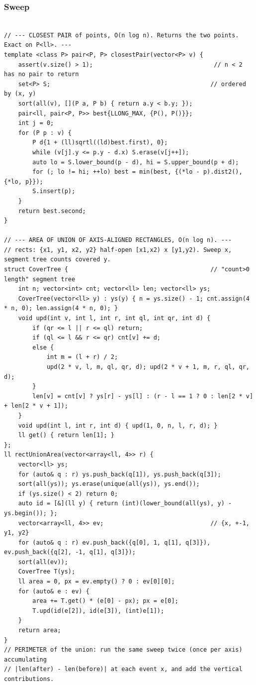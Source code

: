 \documentclass[9pt,a4paper,twocolumn]{extarticle}
\begin{document}
\filbreak
\subsubsection{Sweep}
\nopagebreak
\begin{lstlisting}

// --- CLOSEST PAIR of points, O(n log n). Returns the two points. Exact on P<ll>. ---
template <class P> pair<P, P> closestPair(vector<P> v) {
    assert(v.size() > 1);                                  // n < 2 has no pair to return
    set<P> S;                                             // ordered by (x, y)
    sort(all(v), [](P a, P b) { return a.y < b.y; });
    pair<ll, pair<P, P>> best{LLONG_MAX, {P(), P()}};
    int j = 0;
    for (P p : v) {
        P d{1 + (ll)sqrtl((ld)best.first), 0};
        while (v[j].y <= p.y - d.x) S.erase(v[j++]);
        auto lo = S.lower_bound(p - d), hi = S.upper_bound(p + d);
        for (; lo != hi; ++lo) best = min(best, {(*lo - p).dist2(), {*lo, p}});
        S.insert(p);
    }
    return best.second;
}

// --- AREA OF UNION OF AXIS-ALIGNED RECTANGLES, O(n log n). ---
// rects: {x1, y1, x2, y2} half-open [x1,x2) x [y1,y2). Sweep x, segment tree counts covered y.
struct CoverTree {                                        // "count>0 length" segment tree
    int n; vector<int> cnt; vector<ll> len; vector<ll> ys;
    CoverTree(vector<ll> y) : ys(y) { n = ys.size() - 1; cnt.assign(4 * n, 0); len.assign(4 * n, 0); }
    void upd(int v, int l, int r, int ql, int qr, int d) {
        if (qr <= l || r <= ql) return;
        if (ql <= l && r <= qr) cnt[v] += d;
        else {
            int m = (l + r) / 2;
            upd(2 * v, l, m, ql, qr, d); upd(2 * v + 1, m, r, ql, qr, d);
        }
        len[v] = cnt[v] ? ys[r] - ys[l] : (r - l == 1 ? 0 : len[2 * v] + len[2 * v + 1]);
    }
    void upd(int l, int r, int d) { upd(1, 0, n, l, r, d); }
    ll get() { return len[1]; }
};
ll rectUnionArea(vector<array<ll, 4>> r) {
    vector<ll> ys;
    for (auto& q : r) ys.push_back(q[1]), ys.push_back(q[3]);
    sort(all(ys)); ys.erase(unique(all(ys)), ys.end());
    if (ys.size() < 2) return 0;
    auto id = [&](ll y) { return (int)(lower_bound(all(ys), y) - ys.begin()); };
    vector<array<ll, 4>> ev;                              // {x, +-1, y1, y2}
    for (auto& q : r) ev.push_back({q[0], 1, q[1], q[3]}), ev.push_back({q[2], -1, q[1], q[3]});
    sort(all(ev));
    CoverTree T(ys);
    ll area = 0, px = ev.empty() ? 0 : ev[0][0];
    for (auto& e : ev) {
        area += T.get() * (e[0] - px); px = e[0];
        T.upd(id(e[2]), id(e[3]), (int)e[1]);
    }
    return area;
}
// PERIMETER of the union: run the same sweep twice (once per axis) accumulating
// |len(after) - len(before)| at each event x, and add the vertical contributions.


\end{lstlisting}
\end{document}
